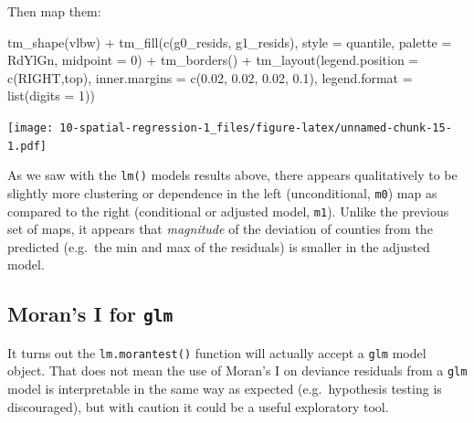 \documentclass[
]{book}
\newenvironment{Shaded}{\begin{snugshade}}{\end{snugshade}}
\newcommand{\AttributeTok}[1]{\textcolor[rgb]{0.77,0.63,0.00}{#1}}
\newcommand{\DecValTok}[1]{\textcolor[rgb]{0.00,0.00,0.81}{#1}}
\newcommand{\FloatTok}[1]{\textcolor[rgb]{0.00,0.00,0.81}{#1}}
\newcommand{\FunctionTok}[1]{\textcolor[rgb]{0.00,0.00,0.00}{#1}}
\newcommand{\NormalTok}[1]{#1}
\newcommand{\SpecialCharTok}[1]{\textcolor[rgb]{0.00,0.00,0.00}{#1}}
\newcommand{\StringTok}[1]{\textcolor[rgb]{0.31,0.60,0.02}{#1}}
\begin{document}
Then map them:

\begin{Shaded}
\begin{Highlighting}[]
\FunctionTok{tm\_shape}\NormalTok{(vlbw) }\SpecialCharTok{+}
  \FunctionTok{tm\_fill}\NormalTok{(}\FunctionTok{c}\NormalTok{(}\StringTok{\textquotesingle{}g0\_resids\textquotesingle{}}\NormalTok{, }\StringTok{\textquotesingle{}g1\_resids\textquotesingle{}}\NormalTok{),}
          \AttributeTok{style =} \StringTok{\textquotesingle{}quantile\textquotesingle{}}\NormalTok{,}
          \AttributeTok{palette =} \StringTok{\textquotesingle{}RdYlGn\textquotesingle{}}\NormalTok{,}
          \AttributeTok{midpoint =} \DecValTok{0}\NormalTok{) }\SpecialCharTok{+}
  \FunctionTok{tm\_borders}\NormalTok{()  }\SpecialCharTok{+}
  \FunctionTok{tm\_layout}\NormalTok{(}\AttributeTok{legend.position =} \FunctionTok{c}\NormalTok{(}\StringTok{\textquotesingle{}RIGHT\textquotesingle{}}\NormalTok{,}\StringTok{\textquotesingle{}top\textquotesingle{}}\NormalTok{),}
            \AttributeTok{inner.margins =} \FunctionTok{c}\NormalTok{(}\FloatTok{0.02}\NormalTok{, }\FloatTok{0.02}\NormalTok{, }\FloatTok{0.02}\NormalTok{, }\FloatTok{0.1}\NormalTok{),}
            \AttributeTok{legend.format =} \FunctionTok{list}\NormalTok{(}\AttributeTok{digits =} \DecValTok{1}\NormalTok{))}
\end{Highlighting}
\end{Shaded}

\texttt{[image: 10-spatial-regression-1\_files/figure-latex/unnamed-chunk-15-1.pdf]}

As we saw with the \texttt{lm()} models results above, there appears qualitatively to be slightly more clustering or dependence in the left (unconditional, \texttt{m0}) map as compared to the right (conditional or adjusted model, \texttt{m1}). Unlike the previous set of maps, it appears that \emph{magnitude} of the deviation of counties from the predicted (e.g.~the min and max of the residuals) is smaller in the adjusted model.

\hypertarget{morans-i-for-glm}{%
\subsection{\texorpdfstring{Moran's I for \texttt{glm}}{Moran's I for glm}}\label{morans-i-for-glm}}

It turns out the \texttt{lm.morantest()} function will actually accept a \texttt{glm} model object. That does not mean the use of Moran's I on deviance residuals from a \texttt{glm} model is interpretable in the same way as expected (e.g.~hypothesis testing is discouraged), but with caution it could be a useful exploratory tool.
\end{document}
